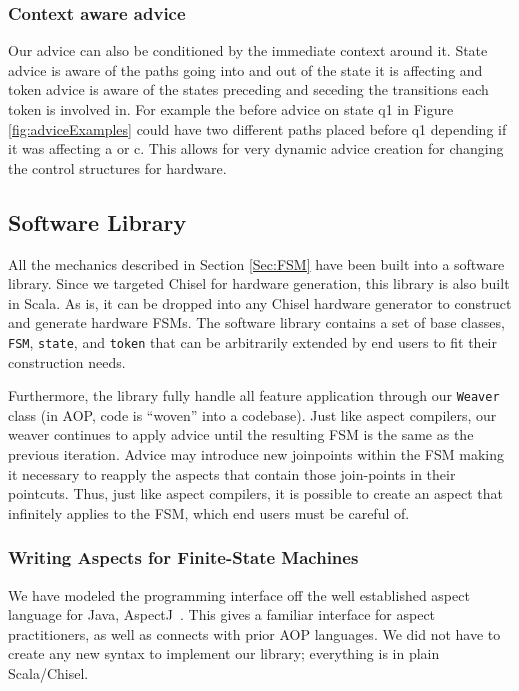 \documentclass[conference]{IEEEtran}
\begin{document}
\subsubsection{Context aware advice} 
Our advice can also be conditioned by the immediate context around it. State advice is aware of the paths going into and out of the state it is affecting and token advice is aware of the states preceding and seceding the transitions each token is involved in. For example the before advice on state q1 in Figure \ref{fig:adviceExamples} could have two different paths placed before q1 depending if it was affecting a or c. This allows for very dynamic advice creation for changing the control structures for hardware.

\subsection{Software Library}\label{sec:foam}
All the mechanics described in Section \ref{Sec:FSM} have been built into a software library. Since we targeted Chisel for hardware generation, this library is also built in Scala. As is, it can be dropped into any Chisel hardware generator to construct and generate hardware FSMs. The software library contains a set of base classes, \texttt{FSM}, \texttt{state}, and \texttt{token} that can be arbitrarily extended by end users to fit their construction needs. 

Furthermore, the library fully handle all feature application through our \texttt{Weaver} class (in AOP, code is ``woven'' into a codebase). Just like aspect compilers, our weaver continues to apply advice until the resulting FSM is the same as the previous iteration. Advice may introduce new joinpoints within the FSM making it necessary to reapply the aspects that contain those join-points in their pointcuts. Thus, just like aspect compilers, it is possible to create an aspect that infinitely applies to the FSM, which end users must be careful of.

\subsubsection{Writing Aspects for Finite-State Machines}
We have modeled the programming interface off the well established aspect language for Java, AspectJ~\cite{AspectJ:01}. This gives a familiar interface for aspect practitioners, as well as connects with prior AOP languages. We did not have to create any new syntax to implement our library; everything is in plain Scala/Chisel.
\end{document}
